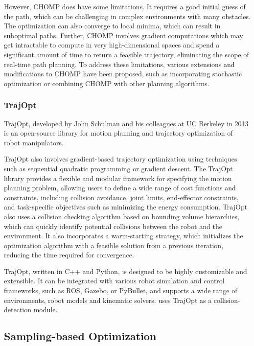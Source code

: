 However, CHOMP does have some limitations. It requires a good initial guess of the path, which can be challenging in complex environments with many obstacles. The optimization can also converge to local minima, which can result in suboptimal paths. Further, CHOMP involves gradient computations which may get intractable to compute in very high-dimensional spaces and spend a significant amount of time to return a feasible trajectory, eliminating the scope of real-time path planning. To address these limitations, various extensions and modifications to CHOMP have been proposed, such as incorporating stochastic optimization or combining CHOMP with other planning algorithms.


\subsubsection{TrajOpt}\label{sec:TrajOpt}

TrajOpt\cite{TrajOpt}, developed by John Schulman and his colleagues at UC Berkeley in 2013 is an open-source library for motion planning and trajectory optimization of robot manipulators.

TrajOpt also involves gradient-based trajectory optimization using techniques such as sequential quadratic programming or gradient descent. The TrajOpt library provides a flexible and modular framework for specifying the motion planning problem, allowing users to define a wide range of cost functions and constraints, including collision avoidance, joint limits, end-effector constraints, and task-specific objectives such as minimizing the energy consumption. TrajOpt also uses a collision checking algorithm based on bounding volume hierarchies, which can quickly identify potential collisions between the robot and the environment. It also incorporates a warm-starting strategy, which initializes the optimization algorithm with a feasible solution from a previous iteration, reducing the time required for convergence.

TrajOpt, written in C++ and Python, is designed to be highly customizable and extensible. It can be integrated with various robot simulation and control frameworks, such as ROS, Gazebo, or PyBullet, and supports a wide range of environments, robot models and kinematic solvers. \cite{OpenRAVE} uses TrajOpt as a collision-detection module.

\subsection{Sampling-based Optimization}\label{sec:bg-sampling-manipulator}

